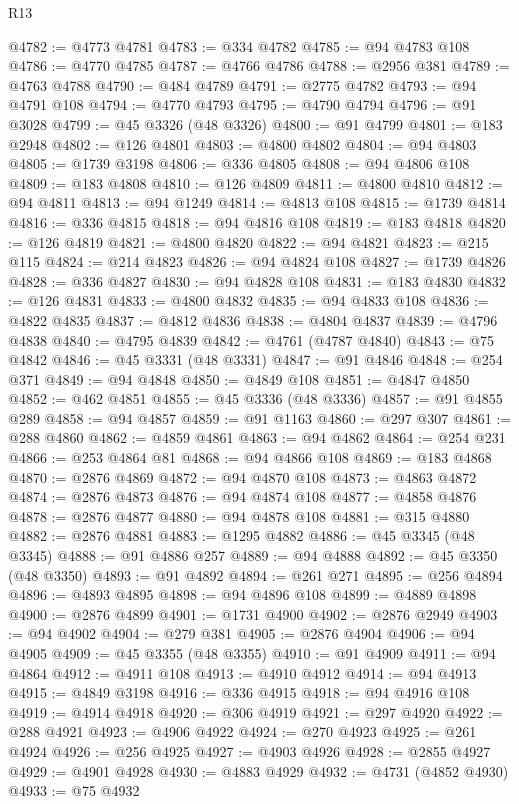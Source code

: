 \begin{lexlean}{R13}
\begin{coremodule}
@4782 := @4773 @4781
@4783 := @334 @4782
@4785 := @94 @4783 @108
@4786 := @4770 @4785
@4787 := @4766 @4786
@4788 := @2956 @381
@4789 := @4763 @4788
@4790 := @484 @4789
@4791 := @2775 @4782
@4793 := @94 @4791 @108
@4794 := @4770 @4793
@4795 := @4790 @4794
@4796 := @91 @3028
@4799 := @45 @3326 (@48 @3326)
@4800 := @91 @4799
@4801 := @183 @2948
@4802 := @126 @4801
@4803 := @4800 @4802
@4804 := @94 @4803
@4805 := @1739 @3198
@4806 := @336 @4805
@4808 := @94 @4806 @108
@4809 := @183 @4808
@4810 := @126 @4809
@4811 := @4800 @4810
@4812 := @94 @4811
@4813 := @94 @1249
@4814 := @4813 @108
@4815 := @1739 @4814
@4816 := @336 @4815
@4818 := @94 @4816 @108
@4819 := @183 @4818
@4820 := @126 @4819
@4821 := @4800 @4820
@4822 := @94 @4821
@4823 := @215 @115
@4824 := @214 @4823
@4826 := @94 @4824 @108
@4827 := @1739 @4826
@4828 := @336 @4827
@4830 := @94 @4828 @108
@4831 := @183 @4830
@4832 := @126 @4831
@4833 := @4800 @4832
@4835 := @94 @4833 @108
@4836 := @4822 @4835
@4837 := @4812 @4836
@4838 := @4804 @4837
@4839 := @4796 @4838
@4840 := @4795 @4839
@4842 := @4761 (@4787 @4840)
@4843 := @75 @4842
@4846 := @45 @3331 (@48 @3331)
@4847 := @91 @4846
@4848 := @254 @371
@4849 := @94 @4848
@4850 := @4849 @108
@4851 := @4847 @4850
@4852 := @462 @4851
@4855 := @45 @3336 (@48 @3336)
@4857 := @91 @4855 @289
@4858 := @94 @4857
@4859 := @91 @1163
@4860 := @297 @307
@4861 := @288 @4860
@4862 := @4859 @4861
@4863 := @94 @4862
@4864 := @254 @231
@4866 := @253 @4864 @81
@4868 := @94 @4866 @108
@4869 := @183 @4868
@4870 := @2876 @4869
@4872 := @94 @4870 @108
@4873 := @4863 @4872
@4874 := @2876 @4873
@4876 := @94 @4874 @108
@4877 := @4858 @4876
@4878 := @2876 @4877
@4880 := @94 @4878 @108
@4881 := @315 @4880
@4882 := @2876 @4881
@4883 := @1295 @4882
@4886 := @45 @3345 (@48 @3345)
@4888 := @91 @4886 @257
@4889 := @94 @4888
@4892 := @45 @3350 (@48 @3350)
@4893 := @91 @4892
@4894 := @261 @271
@4895 := @256 @4894
@4896 := @4893 @4895
@4898 := @94 @4896 @108
@4899 := @4889 @4898
@4900 := @2876 @4899
@4901 := @1731 @4900
@4902 := @2876 @2949
@4903 := @94 @4902
@4904 := @279 @381
@4905 := @2876 @4904
@4906 := @94 @4905
@4909 := @45 @3355 (@48 @3355)
@4910 := @91 @4909
@4911 := @94 @4864
@4912 := @4911 @108
@4913 := @4910 @4912
@4914 := @94 @4913
@4915 := @4849 @3198
@4916 := @336 @4915
@4918 := @94 @4916 @108
@4919 := @4914 @4918
@4920 := @306 @4919
@4921 := @297 @4920
@4922 := @288 @4921
@4923 := @4906 @4922
@4924 := @270 @4923
@4925 := @261 @4924
@4926 := @256 @4925
@4927 := @4903 @4926
@4928 := @2855 @4927
@4929 := @4901 @4928
@4930 := @4883 @4929
@4932 := @4731 (@4852 @4930)
@4933 := @75 @4932

\end{coremodule}
\end{lexlean}
